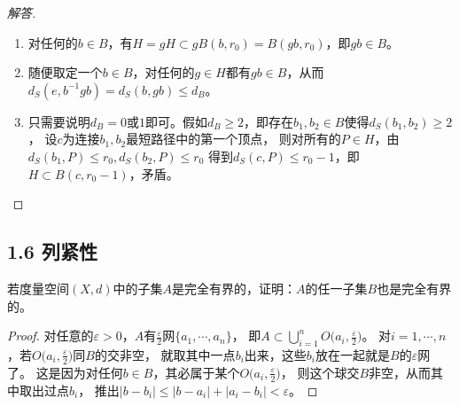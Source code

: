 \begin{proof}[解答]
\begin{enumerate}[label=(\roman*)]
    ➣ 如果$\oslash_1\ne\boxminus_1$，容易说明
    \[d_S(\oslash_1\cdots\oslash_s,\boxminus_1\cdots\boxminus_t)=d_S(\oslash_1,\boxminus_1\cdots\boxminus_t)+(s-1),\]
    即$d_S(u_2,P)=d_S(v,P)+(s-1)$，结合$s\geqslant2$和$d_S(u_2,P) \leqslant r$得到$d_S(v,P) \leqslant r-1$。

    ➢ 如果$\oslash_1=\boxminus_1$，
    * 当$t>0$时$P=v\boxminus_2\cdots\boxminus_t$，那么$d_S(v,P)=t-1 \leqslant r-1$，
    * 当$t=0$时$P=u_1$，从而$2 \leqslant d_S(u_1,u_2)=d_S(u_2,P) \leqslant r$，那么$d_S(v,P)=1 \leqslant r-1$。

    \item 对任何的$b \in B$，有$H=gH \subset gB(b,r_0)=B(gb,r_0)$，即$gb \in B$。
    \item 随便取定一个$b \in B$，对任何的$g \in H$都有$gb \in B$，从而$d_S(e,b^{-1}gb)=d_S(b,gb) \leqslant d_B$。
    \item 只需要说明$d_B=0$或$1$即可。假如$d_B\geqslant2$，即存在$b_1,b_2 \in B$使得$d_S(b_1,b_2)\geqslant2$，
    设$c$为连接$b_1,b_2$最短路径中的第一个顶点，
    则对所有的$P \in H$，由$d_S(b_1,P) \leqslant r_0,d_S(b_2,P) \leqslant r_0$
    得到$d_S(c,P) \leqslant r_0-1$，即$H \subset B(c,r_0-1)$，矛盾。\qedhere
    \end{enumerate}
\end{proof}

\subsection{1.6 列紧性}
\begin{4}
    若度量空间$(X,d)$中的子集$A$是完全有界的，证明：$A$的任一子集$B$也是完全有界的。
\end{4}
\begin{proof}
    对任意的$\varepsilon>0$，$A$有$\frac{\varepsilon}{2}$网$\{a_1,\cdots,a_n\}$，
    即$A\subset\bigcup\limits_{i=1}^{n}O\big(a_i,\frac{\varepsilon}{2}\big)$。
    对$i=1,\cdots,n$，若$O\big(a_i,\frac{\varepsilon}{2}\big)$同$B$的交非空，
    就取其中一点$b_i$出来，这些$b_i$放在一起就是$B$的$\varepsilon$网了。
    这是因为对任何$b \in B$，其必属于某个$O\big(a_i,\frac{\varepsilon}{2}\big)$，
    则这个球交$B$非空，从而其中取出过点$b_i$，
    推出$|b-b_i|\leqslant|b-a_i|+|a_i-b_i|<\varepsilon$。
\end{proof}

